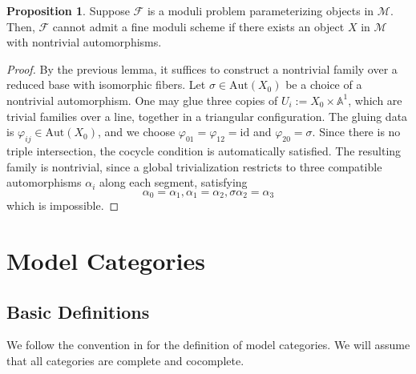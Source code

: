 \documentclass{article}
\newcommand{\A}{\mathbb{A}}
\newcommand{\Aut}{\textrm{Aut}}
\newcommand{\id}{\textrm{id}}
\theoremstyle{definition}
\theoremstyle{definition}
\theoremstyle{definition}
\theoremstyle{definition}
\newtheorem{proposition}{Proposition}[theorem]
\theoremstyle{definition}
\theoremstyle{definition}
\theoremstyle{definition}
\begin{document}
\begin{proposition}
	Suppose $\mathcal{F}$ is a moduli problem parameterizing objects in $\mathcal{M}$.  Then, $\mathcal{F}$ cannot admit a fine moduli scheme if there exists an object $X$ in $\mathcal{M}$ with nontrivial automorphisms.
\end{proposition}
\begin{proof}
By the previous lemma, it suffices to construct a nontrivial family over a reduced base with isomorphic fibers. Let $\sigma\in \Aut(X_0)$ be a choice of a nontrivial automorphism. One may glue three copies of $U_{i}:= X_0\times \A^1$, which are trivial families over a line, together in a triangular configuration. The gluing data is $\varphi_{ij}\in \Aut(X_0)$, and we choose $\varphi_{01}=\varphi_{12}=\id$ and $\varphi_{20}=\sigma$. Since there is no triple intersection, the cocycle condition is automatically satisfied. The resulting family is nontrivial, since a global trivialization restricts to three compatible automorphisms $\alpha_i$ along each segment, satisfying
\[\alpha_0=\alpha_1, \alpha_1=\alpha_2, \sigma\alpha_2=\alpha_3\]
which is impossible.
\end{proof}

















































\newpage

\appendix 
\section{Model Categories}
\subsection{Basic Definitions}
We follow the convention in \cite{Hovey1999} for the definition of model categories. We will assume that all categories are complete and cocomplete. 
\end{document}
